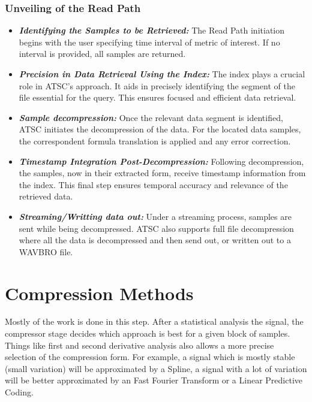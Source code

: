 \documentclass[conference]{IEEEtran}
\begin{document}
\subsubsection{Unveiling of the Read Path}\label{SCMC}
\begin{itemize}

\item{\textbf{\textit{Identifying the Samples to be Retrieved:}}} The Read Path initiation begins with the user specifying time interval of metric of interest. If no interval is provided, all samples are returned.

\vspace{5pt}
\item{\textbf{\textit{Precision in Data Retrieval Using the Index:}}} The index plays a crucial role in ATSC's approach. It aids in precisely identifying the segment of the file essential for the query. This ensures focused and efficient data retrieval.

\vspace{5pt}
\item{\textbf{\textit{Sample decompression:}}} Once the relevant data segment is identified, ATSC initiates the decompression of the data.
For the located data samples, the correspondent formula translation is applied and any error correction.

\vspace{5pt}
\item{\textbf{\textit{Timestamp Integration Post-Decompression:}}} Following decompression, the samples, now in their extracted form, receive timestamp information from the index. This final step ensures temporal accuracy and relevance of the retrieved data.

\vspace{5pt}
\item{\textbf{\textit{Streaming/Writting data out:}}} Under a streaming process, samples are sent while being decompressed. ATSC also supports full file decompression where all the data is decompressed and then send out, or written out to a WAVBRO file.
\end{itemize}

\section{Compression Methods}

Mostly of the work is done in this step. After a statistical analysis the signal, the compressor stage decides which approach is best for a given block of samples.
Things like first and second derivative analysis also allows a more precise selection of the compression form. 
For example, a signal which is mostly stable (small variation) will be approximated by a Spline, a signal with a lot of variation will be better approximated by an Fast Fourier Transform or a Linear Predictive Coding.
\end{document}
